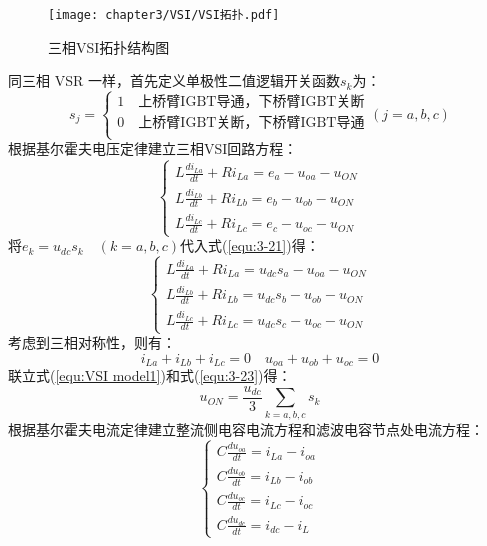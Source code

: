 \begin{figure}[!htp]
	\centering
	\texttt{[image: chapter3/VSI/VSI拓扑.pdf]}
	\caption{三相VSI拓扑结构图}
	\label{fig:三相VSI拓扑结构图}
\end{figure}
同三相 VSR 一样，首先定义单极性二值逻辑开关函数$s_{k}$为：
\begin{equation}
	s_{j} =
	\begin{cases}
		1 \quad \text{上桥臂IGBT导通，下桥臂IGBT关断} \\
		0 \quad \text{上桥臂IGBT关断，下桥臂IGBT导通} \\
	\end{cases}
	(j=a,b,c)
	\label{equ:Sk}
\end{equation}
根据基尔霍夫电压定律建立三相VSI回路方程：
\begin{equation}
	\begin{cases}
		L \frac{d i_{La}}{dt}+R i_{La}=e_{a}-u_{oa}-u_{ON} \\
		L \frac{d i_{Lb}}{dt}+R i_{Lb}=e_{b}-u_{ob}-u_{ON} \\
		L \frac{d i_{Lc}}{dt}+R i_{Lc}=e_{c}-u_{oc}-u_{ON}
	\end{cases}
	\label{equ:3-21}
\end{equation}
将$e_{k}=u_{dc}s_{k}\quad(k=a,b,c)$代入式(\ref{equ:3-21})得：
\begin{equation}
	\begin{cases}
		L\frac{di_{La}}{dt}+Ri_{La}=u_{dc}s_{a}-u_{oa}-u_{ON} \\
		L\frac{di_{Lb}}{dt}+Ri_{Lb}=u_{dc}s_{b}-u_{ob}-u_{ON} \\
		L\frac{di_{Lc}}{dt}+Ri_{Lc}=u_{dc}s_{c}-u_{oc}-u_{ON}
		\label{equ:VSI model1}
	\end{cases}
\end{equation}
考虑到三相对称性，则有：
\begin{equation}
	i_{La}+i_{Lb}+i_{Lc}=0 \quad u_{oa}+u_{ob}+u_{oc}=0 \label{equ:3-23}
\end{equation}
联立式(\ref{equ:VSI model1})和式(\ref{equ:3-23})得：
\begin{equation}
	u_{ON}=\frac{u_{dc}}{3}\sum_{k=a,b,c}s_{k}
\end{equation}
根据基尔霍夫电流定律建立整流侧电容电流方程和滤波电容节点处电流方程：
\begin{equation}
	\begin{cases}
		C\frac{du_{oa}}{dt}=i_{La}-i_{oa} \\
		C\frac{du_{ob}}{dt}=i_{Lb}-i_{ob} \\
		C\frac{du_{oc}}{dt}=i_{Lc}-i_{oc} \\
		C\frac{du_{dc}}{dt}=i_{dc}-i_{L}
	\end{cases}
\end{equation}

